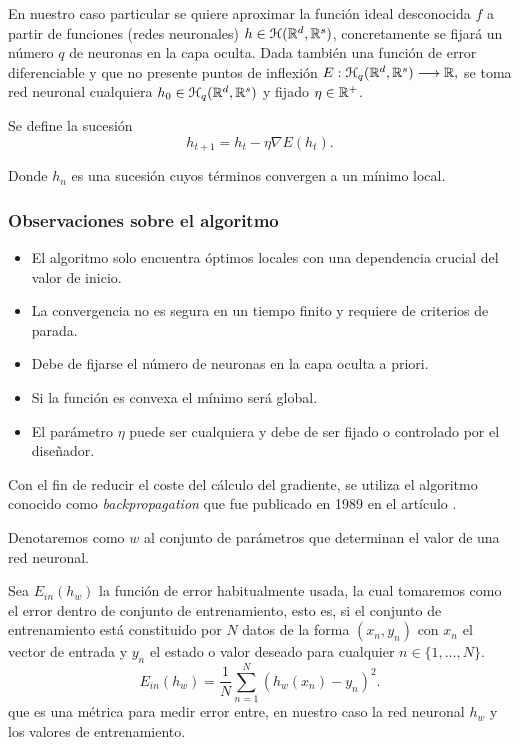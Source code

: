 En nuestro caso particular se quiere aproximar la función ideal desconocida $f$ a partir de funciones (redes neuronales) $h \in \mathcal{H}(\mathbb{R}^d,\mathbb{R}^s)$, concretamente se fijará un número $q$ de neuronas en la capa oculta. 
Dada también una función de error diferenciable y que no presente puntos de inflexión
$E: \mathcal{H}_q (\mathbb{R}^d, \mathbb{R}^s) \longrightarrow \mathbb{R},$
se toma red neuronal cualquiera $h_0 \in \mathcal{H}_q (\mathbb{R}^d, \mathbb{R}^s)$ y 
fijado $\eta \in \mathbb{R}^+$. 

Se define la sucesión 
\begin{equation}\label{eq:descenso-gradiente}
    h_{t+1}  = h_t - \eta \nabla E(h_t).
\end{equation}  

Donde $h_n$ es una sucesión cuyos términos convergen a un mínimo local.
\subsubsection*{Observaciones sobre el algoritmo }

\begin{itemize}
    \item El algoritmo solo encuentra óptimos locales con una dependencia crucial del valor de inicio. 
    \item La convergencia no es segura en un tiempo finito y requiere de criterios de parada. 
    \item Debe de fijarse el número de neuronas en la capa oculta a priori.
    \item Si la función es convexa el mínimo será global.
    \item El parámetro $\eta$ puede ser cualquiera y debe de ser fijado o controlado por el diseñador.  
\end{itemize}


Con el fin de reducir el coste del cálculo del gradiente, 
se utiliza el algoritmo conocido como \textit{backpropagation} que fue publicado en 
1989 en el artículo \cite{backpropagation-Hinton}. 

Denotaremos como $w$ al conjunto de parámetros que determinan el valor de una red neuronal. 

Sea $E_{in}(h_w)$ la función de error habitualmente usada, la cual tomaremos como el error dentro de conjunto de entrenamiento, esto es,  si el conjunto 
de entrenamiento está constituido por $N$ datos de la forma $(x_n, y_n)$ con $x_n$ el vector de entrada y $y_n$ el estado o valor deseado para cualquier $n\in \{1, \ldots, N\}.$
\begin{equation}
    E_{in}(h_w) = \frac{1}{N} \sum^N_{n=1} (h_w(x_n)- y_n)^2. 
\end{equation}
que es una métrica para medir error entre, en nuestro caso  
la red neuronal $h_w$ y los valores de entrenamiento.

